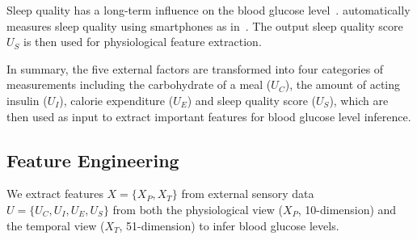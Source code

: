 Sleep quality has a long-term influence on the blood glucose level~\cite{bib:DRCP15:Iwasaki}.
\sysname automatically measures sleep quality using smartphones as in~\cite{bib:UbiComp14:Gu}.
The output sleep quality score $U_S$ is then used for physiological feature extraction.

In summary, the five external factors are transformed into four categories of measurements including the carbohydrate of a meal ($U_C$), the amount of acting insulin ($U_I$), calorie expenditure ($U_E$) and sleep quality score ($U_S$), which are then used as input to extract important features for blood glucose level inference.

\subsection{Feature Engineering}
\label{subsec:features}
We extract features $X=\{X_P, X_T\}$ from external sensory data $U=\{U_C, U_I, U_E, U_S\}$ from both the physiological view ($X_P$, 10-dimension) and the temporal view ($X_T$, 51-dimension) to infer blood glucose levels.

